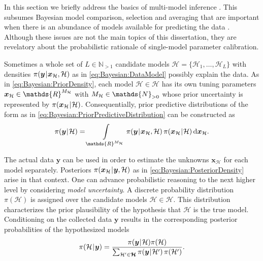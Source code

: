 In this section we briefly address the basics of multi-model inference \cite{Statistics:Burnham2002,Statistics:Claeskens2008,Statistics:Ando2010}.
This subsumes Bayesian model comparison, selection and averaging that are important when there is an abundance of models available for predicting the data
\cite{Bayesian:Draper1995,Bayesian:Clyde2004,Bayesian:Walker2013}.
Although these issues are not the main topics of this dissertation, they are revelatory about the probabilistic rationale of single-model parameter calibration.
\par %
Sometimes a whole set of \(L \in \mathds{N}_{>1}\) candidate models \(\bm{\mathcal{H}} = \{\mathcal{H}_1,\ldots,\mathcal{H}_L\}\) with densities
\(\pi(\bm{y} {\:\!}|{\:\!} \bm{x}_\mathcal{H},\mathcal{H})\) as in \cref{eq:Bayesian:DataModel} possibly explain the data.
As in \cref{eq:Bayesian:PriorDensity}, each model \(\mathcal{H} \in \bm{\mathcal{H}}\) has its own tuning parameters \(\bm{x}_\mathcal{H} \in \mathds{R}^{\dimParam_\mathcal{H}}\)
with \(\dimParam_\mathcal{H} \in \mathds{N}_{>0}\) whose prior uncertainty is represented by \(\pi(\bm{x}_\mathcal{H} {\:\!}|{\:\!} \mathcal{H})\).
Consequentially, prior predictive distributions of the form as in \cref{eq:Bayesian:PriorPredictiveDistribution} can be constructed as
\begin{equation} \label{eq:Bayesian:ModelLikelihood}
  \pi(\bm{y} \cond \mathcal{H})
  = \int\limits_{\mathds{R}^{\dimParam_\mathcal{H}}} \pi(\bm{y} \cond \bm{x}_\mathcal{H},\mathcal{H}) \, \pi(\bm{x}_\mathcal{H} \cond \mathcal{H}) \, \mathrm{d} \bm{x}_\mathcal{H}.
\end{equation}
\par %
The actual data \(\bm{y}\) can be used in order to estimate the unknowns \(\bm{x}_\mathcal{H}\) for each model separately.
Posteriors \(\pi(\bm{x}_\mathcal{H} {\:\!}|{\:\!} \bm{y},\mathcal{H})\) as in \cref{eq:Bayesian:PosteriorDensity} arise in that context.
One can advance probabilistic reasoning to the next higher level by considering \emph{model uncertainty}.
A discrete probability distribution \(\pi(\mathcal{H})\) is assigned over the candidate models \(\mathcal{H} \in \bm{\mathcal{H}}\).
This distribution characterizes the prior plausibility of the hypothesis that \(\mathcal{H}\) is the true model.
Conditioning on the collected data \(\bm{y}\) results in the corresponding posterior probabilities of the hypothesized models
\begin{equation} \label{eq:Bayesian:ModelPosterior}
  \pi(\mathcal{H} {\:\!}|{\:\!} \bm{y})
  = \frac{\pi(\bm{y} {\:\!}|{\:\!} \mathcal{H}) \pi(\mathcal{H})}{\sum_{\mathcal{H}^\prime \in \bm{\mathcal{H}}} \pi(\bm{y} {\:\!}|{\:\!} \mathcal{H}^\prime) \, \pi(\mathcal{H}^\prime)}.
\end{equation}
